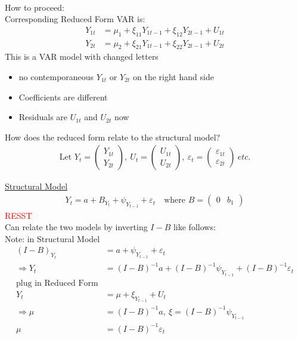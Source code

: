  \\

How to proceed: \\

Corresponding Reduced Form VAR is:
\begin{align*}
    Y_{1t} &= \mu_1 + \xi_{11} Y_{1t-1} + \xi_{12} Y_{2t-1} + U_{1t}\\
    Y_{2t} &= \mu_2 + \xi_{21} Y_{1t-1} + \xi_{22} Y_{2t-1} + U_{2t}
\end{align*}
This is a VAR model with changed letters 
\begin{itemize}
    \item no contemporaneous $Y_{1t}$ or $Y_{2t}$ on the right hand side
    \item Coefficients are different
    \item Residuals are $U_{1t}$ and $U_{2t}$ now
\end{itemize}
How does the reduced form relate to the structural model? 
\begin{align*}
    \text{Let } Y_t = \begin{pmatrix}
        Y_{1t} \\
        Y_{2t}
    \end{pmatrix},\ U_t = \begin{pmatrix}
        U_{1t} \\
        U_{2t}
    \end{pmatrix},\  \varepsilon_t = \begin{pmatrix}
        \varepsilon_{1t}\\
        \varepsilon_{2t}
    \end{pmatrix} \ etc.
\end{align*}

\underline{Structural Model}
\begin{align*}
    Y_t = a + B_{Y_t} + \psi_{Y_{t-1}} + \varepsilon_t \quad \text{where } B=\begin{pmatrix}
        0 & b_1  
    \end{pmatrix}
\end{align*}
\textcolor{red}{RESST}\\

Can relate the two models by inverting $I-B$ like follows:\\

Note: in Structural Model \begin{align*}
    (I-B)_{Y_t} &= a + \psi_{Y_{t-1}} + \varepsilon_t \\
    \Rightarrow Y_t &= (I-B)^{-1} a + (I-B)^{-1} \psi_{Y_{t-1}}+ (I-B)^{-1}\varepsilon_t \\
    \text{plug in Reduced Form} \\
    Y_t&= \mu+ \xi_{Y_{t-1}}+ U_t \\
    \Rightarrow \mu&= (I-B)^{-1}a,\ \xi= (I-B)^{-1} \psi_{Y_{t-1}} \\
    \mu &= (I-B)^{-1} \varepsilon_t
\end{align*}


